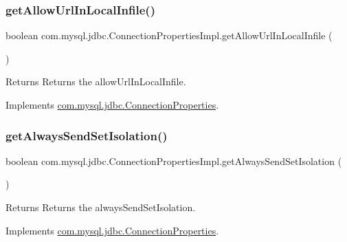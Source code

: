 \subsubsection{\texorpdfstring{get\+Allow\+Url\+In\+Local\+Infile()}{getAllowUrlInLocalInfile()}}
{\footnotesize\ttfamily boolean com.\+mysql.\+jdbc.\+Connection\+Properties\+Impl.\+get\+Allow\+Url\+In\+Local\+Infile (\begin{DoxyParamCaption}{ }\end{DoxyParamCaption})}

\begin{DoxyReturn}{Returns}
Returns the allow\+Url\+In\+Local\+Infile. 
\end{DoxyReturn}


Implements \mbox{\hyperlink{interfacecom_1_1mysql_1_1jdbc_1_1_connection_properties_aa0b1ef6e51c18b41376c5651833f11b8}{com.\+mysql.\+jdbc.\+Connection\+Properties}}.

\mbox{\label{classcom_1_1mysql_1_1jdbc_1_1_connection_properties_impl_a38ee7b9e4456b9a7c58c9840a21403f6}} 
\subsubsection{\texorpdfstring{get\+Always\+Send\+Set\+Isolation()}{getAlwaysSendSetIsolation()}}
{\footnotesize\ttfamily boolean com.\+mysql.\+jdbc.\+Connection\+Properties\+Impl.\+get\+Always\+Send\+Set\+Isolation (\begin{DoxyParamCaption}{ }\end{DoxyParamCaption})}

\begin{DoxyReturn}{Returns}
Returns the always\+Send\+Set\+Isolation. 
\end{DoxyReturn}


Implements \mbox{\hyperlink{interfacecom_1_1mysql_1_1jdbc_1_1_connection_properties_a157a33612cbef9f88801ad8f2a4209b4}{com.\+mysql.\+jdbc.\+Connection\+Properties}}.

